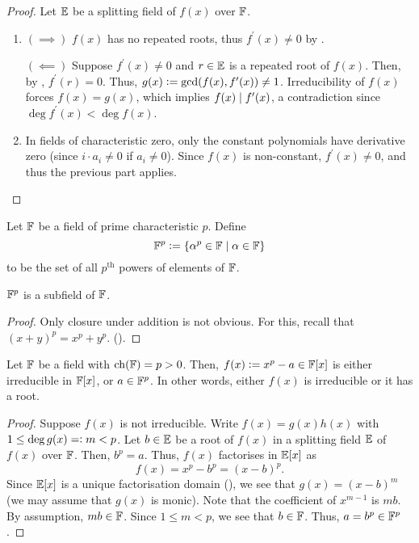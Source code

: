 \begin{proof}
    Let $\mathbb{E}$ be a splitting field of $f(x)$ over $\mathbb{F}$.
    \begin{enumerate}
        \item $(\implies)$ $f(x)$ has no repeated roots, thus $f^{\prime}(x) \neq 0$ by .
        
        $(\impliedby)$ Suppose $f^{\prime}(x) \neq 0$ and $r \in \mathbb{E}$ is a repeated root of $f(x)$. Then, by , $f^{\prime}(r) = 0$. Thus, $g(x) \vcentcolon= \gcd(f(x), f^{\prime}(x)) \neq 1$. Irreducibility of $f(x)$ forces $f(x) = g(x)$, which implies $f(x) \mid f^{\prime}(x)$, a contradiction since $\deg f^{\prime}(x) < \deg f(x)$. 
        
        \item In fields of characteristic zero, only the constant polynomials have derivative zero (since $i \cdot a_i \neq 0$ if $a_i \neq 0$). Since $f(x)$ is non-constant, $f^{\prime}(x) \neq 0$, and thus the previous part applies. \qedhere
    \end{enumerate}
\end{proof}
\begin{defn}
    Let $\mathbb{F}$ be a field of prime characteristic $p$. Define
    \[
        \mathbb{F}^p \vcentcolon= \left\{ \alpha^p \in \mathbb{F} \mid \alpha \in \mathbb{F} \right\}
    \]
    to be the set of all $p^{\text{th}}$ powers of elements of $\mathbb{F}$.
\end{defn}
\begin{prop}
    $\mathbb{F}^p$ is a subfield of $\mathbb{F}$. 
\end{prop}
\begin{proof}
    Only closure under addition is not obvious. For this, recall that $(x+y)^p = x^p + y^p$. ().
\end{proof}

\begin{prop} \label{prop:p-power-irreducible-or-root}
    Let $\mathbb{F}$ be a field with $\operatorname{ch}(\mathbb{F}) = p > 0$. Then, $f(x)\vcentcolon= x^p -a \in \mathbb{F}[x]$ is either irreducible in $\mathbb{F}[x]$, or $a \in \mathbb{F}^p$. In other words, either $f(x)$ is irreducible or it has a root.
\end{prop}
\begin{proof}
    Suppose $f(x)$ is not irreducible. Write $f(x) = g(x)h(x)$ with $1 \leq \deg g(x) =\vcentcolon m < p$. Let $b \in \mathbb{E}$ be a root of $f(x)$ in a splitting field $\mathbb{E}$ of $f(x)$ over $\mathbb{F}$. Then, $b^p = a$. Thus, $f(x)$ factorises in $\mathbb{E}[x]$ as 
    \[
        f(x) = x^p - b^p = (x-b)^p.
    \]
    Since $\mathbb{E}[x]$ is a unique factorisation domain (), we see that $g(x) = (x-b)^m$ (we may assume that $g(x)$ is monic). Note that the coefficient of $x^{m-1}$ is $mb$. By assumption, $mb \in \mathbb{F}$. Since $1 \leq m < p$, we see that $b \in \mathbb{F}$. Thus, $a = b^p \in \mathbb{F}^p$.
\end{proof}

